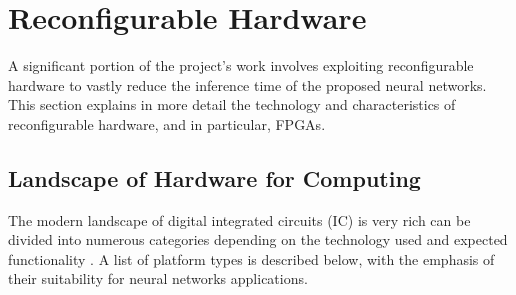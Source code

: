 \section{Reconfigurable Hardware}
A significant portion of the project's work involves exploiting reconfigurable hardware to vastly reduce the inference time of the proposed neural networks. This section explains in more detail the technology and characteristics of reconfigurable hardware, and in particular, FPGAs.

\subsection{Landscape of Hardware for Computing}
The modern landscape of digital integrated circuits (IC) is very rich can be divided into numerous categories depending on the technology used and expected functionality \cite{14-najafi2017hardware}. A list of platform types is described below, with the emphasis of their suitability for neural networks applications.

